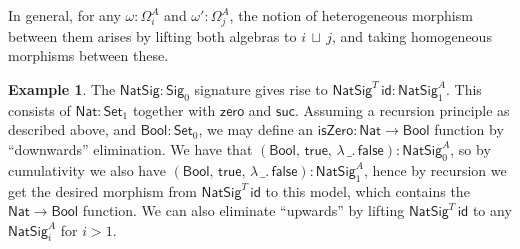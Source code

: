 \documentclass[12pt,a4paper,twoside,openany]{book}
\theoremstyle{remark}
\theoremstyle{definition}
\newtheorem{myexample}{Example}
\theoremstyle{theorem}
\newcommand{\ms}[1]{\mathsf{#1}}
\newcommand{\zero}{\ms{zero}}
\newcommand{\suc}{\ms{suc}}
\newcommand{\id}{\mathsf{id}}
\newcommand{\Set}{\mathsf{Set}}
\newcommand{\Sig}{\mathsf{Sig}}
\newcommand{\Nat}{\ms{Nat}}
\newcommand{\Bool}{\ms{Bool}}
\newcommand{\true}{\ms{true}}
\newcommand{\false}{\ms{false}}
\newcommand{\lub}{\,\sqcup\,}
\begin{document}
In general, for any $\omega : \Omega^A_{i}$ and $\omega' : \Omega^A_{j}$, the
notion of heterogeneous morphism between them arises by lifting both algebras to
$i \lub j$, and taking homogeneous morphisms between these.

\begin{myexample}
The $\ms{NatSig} : \Sig_0$ signature gives rise to $\ms{NatSig}^T\,\id :
\ms{NatSig}^A_1$. This consists of $\ms{Nat} : \Set_1$ together with $\zero$ and
$\suc$. Assuming a recursion principle as described above, and $\Bool : \Set_0$,
we may define an $\ms{isZero} : \Nat \to \Bool$ function by ``downwards''
elimination.  We have that $(\Bool,\,\true,\,\lambda\,\_.\,\false) :
\ms{NatSig}^A_0$, so by cumulativity we also have
$(\Bool,\,\true,\,\lambda\,\_.\,\false) : \ms{NatSig}^A_1$, hence by recursion
we get the desired morphism from $\ms{NatSig}^T\,\id$ to this model, which
contains the $\Nat \to \Bool$ function. We can also eliminate ``upwards'' by
lifting $\ms{NatSig}^T\,\id$ to any $\ms{NatSig}^A_i$ for $i > 1$.
\end{myexample}
\end{document}
